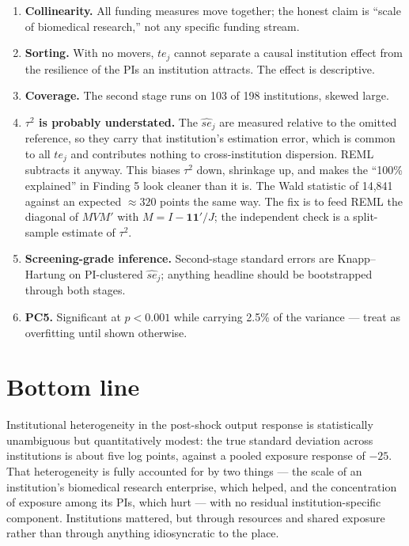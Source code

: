 \documentclass[11pt]{article}
\begin{document}
\begin{enumerate}
\item \textbf{Collinearity.} All funding measures move together; the honest
claim is ``scale of biomedical research,'' not any specific funding stream.
\item \textbf{Sorting.} With no movers, $te_j$ cannot separate a causal
institution effect from the resilience of the PIs an institution attracts.
The effect is descriptive.
\item \textbf{Coverage.} The second stage runs on 103 of 198 institutions,
skewed large.
\item \textbf{$\tau^2$ is probably understated.} The $\widehat{se}_j$ are
measured relative to the omitted reference, so they carry that institution's
estimation error, which is common to all $te_j$ and contributes nothing to
cross-institution dispersion. REML subtracts it anyway. This biases $\tau^2$
down, shrinkage up, and makes the ``100\% explained'' in Finding 5 look
cleaner than it is. The Wald statistic of 14,841 against an expected $\approx
320$ points the same way. The fix is to feed REML the diagonal of $MVM'$ with
$M = I - \mathbf{1}\mathbf{1}'/J$; the independent check is a split-sample
estimate of $\tau^2$.
\item \textbf{Screening-grade inference.} Second-stage standard errors are
Knapp--Hartung on PI-clustered $\widehat{se}_j$; anything headline should be
bootstrapped through both stages.
\item \textbf{PC5.} Significant at $p<0.001$ while carrying 2.5\% of the
variance --- treat as overfitting until shown otherwise.
\end{enumerate}

\section{Bottom line}

Institutional heterogeneity in the post-shock output response is
statistically unambiguous but quantitatively modest: the true standard
deviation across institutions is about five log points, against a pooled
exposure response of $-25$. That heterogeneity is fully accounted for by two
things --- the scale of an institution's biomedical research enterprise, which
helped, and the concentration of exposure among its PIs, which hurt --- with
no residual institution-specific component. Institutions mattered, but
through resources and shared exposure rather than through anything
idiosyncratic to the place.
\end{document}
